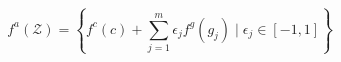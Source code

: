 \documentclass[oneside,11pt,dvipsnames]{book}
\numberwithin{equation}{section}
\theoremstyle{definition}
\theoremstyle{remark}
\begin{document}
\[
f^a(\mathcal{Z}) = \left\{ f^c(c) + \sum_{j=1}^{m} \epsilon_j f^g(g_j) \mid \epsilon_j \in [-1, 1] \right\}
\]


\end{document}

